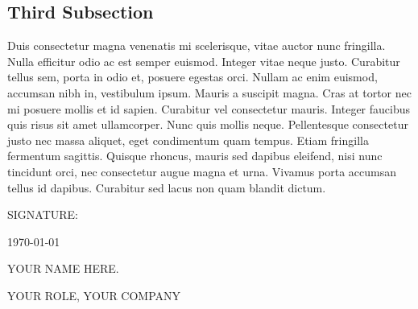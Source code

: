 \documentclass[a4paper,margin=1in]{article}
\begin{document}
\subsection{Third Subsection}

Duis consectetur magna venenatis mi scelerisque, vitae auctor nunc fringilla. Nulla efficitur odio ac est semper euismod. Integer vitae neque justo. Curabitur tellus sem, porta in odio et, posuere egestas orci. Nullam ac enim euismod, accumsan nibh in, vestibulum ipsum. Mauris a suscipit magna. Cras at tortor nec mi posuere mollis et id sapien. Curabitur vel consectetur mauris. Integer faucibus quis risus sit amet ullamcorper. Nunc quis mollis neque. Pellentesque consectetur justo nec massa aliquet, eget condimentum quam tempus. Etiam fringilla fermentum sagittis. Quisque rhoncus, mauris sed dapibus eleifend, nisi nunc tincidunt orci, nec consectetur augue magna et urna. Vivamus porta accumsan tellus id dapibus. Curabitur sed lacus non quam blandit dictum.\\

\vspace*{\vfill}

\hspace*{5cm}\phantom{Aprovado: }SIGNATURE: \hrulefill

\hspace*{7cm}\phantom{Aprovado: }{Aproved: }\today

\hspace*{7cm}\phantom{Aprovado: }YOUR NAME HERE.

\hspace*{7cm}\phantom{Aprovado: }YOUR ROLE, YOUR COMPANY
\end{document}
